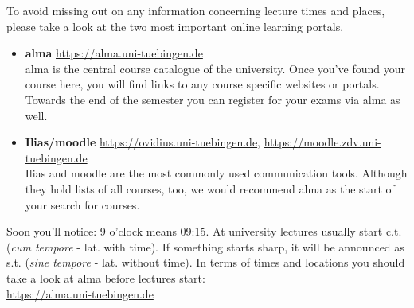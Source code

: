 To avoid missing out on any information concerning lecture times and places, please take a look at the two most important online learning portals.
\begin{itemize}
	\item \textbf{alma} \url{https://alma.uni-tuebingen.de} \\
	alma is the central course catalogue of the university. Once you've found your course here, you will find links to any course specific websites or portals.
	Towards the end of the semester you can register for your exams via alma as well.
	\item \textbf{Ilias/moodle} \url{https://ovidius.uni-tuebingen.de}, \url{https://moodle.zdv.uni-tuebingen.de} \\
	Ilias and moodle are the most commonly used communication tools. Although they hold lists of all courses, too, we would recommend alma as the start of your search for courses.
\end{itemize}

Soon you'll notice: 9 o'clock means 09:15. At university lectures usually start c.t. (\textit{cum
tempore} - lat. with time). If something starts \glqq sharp\grqq, it will be announced as s.t. (\textit{sine tempore} - lat. without
time). In terms of times and locations you should take a look at alma before lectures start:\\
\url{https://alma.uni-tuebingen.de} \\ \\

